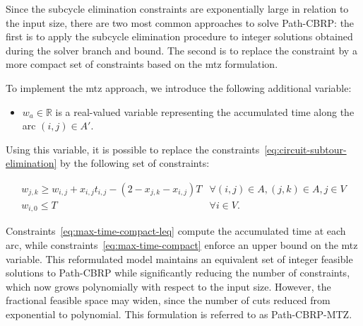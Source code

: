 Since the subcycle elimination constraints are exponentially large in relation
to the input size, there are two most common approaches to solve Path-CBRP: the
first is to apply the subcycle elimination procedure to integer solutions
obtained during the solver branch and bound. The second is to replace the
constraint by a more compact set of constraints based on the \gls{mtz}
formulation.


To implement the \gls{mtz} approach, we introduce the following additional
variable: 

\begin{itemize}
	\item $w_{a} \in \mathbb{R}$ is a real-valued variable representing the accumulated
	      time along the arc $(i, j) \in A'$.
\end{itemize}

Using this variable, it is possible to replace the
constraints~\eqref{eq:circuit-subtour-elimination} by the following set of
constraints:

\begin{align}
	 & w_{j,k} \geq w_{i,j} + x_{i,j}t_{i,j} - (2 - x_{j,k} - x_{i,j})T & \forall (i, j) \in A, (j, k) \in A, j \in V \label{eq:max-time-compact-leq}                               \\
	 & w_{i,0} \leq T                                                   & \forall i \in V.                                                            & \label{eq:max-time-compact}
\end{align}

Constraints~\eqref{eq:max-time-compact-leq} compute the accumulated time at each
arc, while constraints~\eqref{eq:max-time-compact} enforce an upper bound on the
\gls{mtz} variable. This reformulated model maintains an equivalent set of
integer feasible solutions to Path-CBRP while significantly reducing the number
of constraints, which now grows polynomially with respect to the input size.
However, the fractional feasible space may widen, since the number of cuts
reduced from exponential to polynomial. This formulation is referred to as
Path-CBRP-MTZ.

